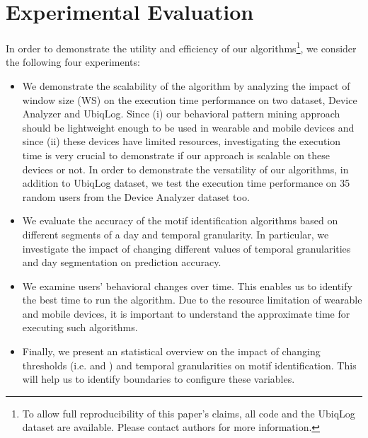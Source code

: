 \documentclass{sig-alternate}
\begin{document}
\section{Experimental Evaluation}
In order to demonstrate the utility and efficiency of our algorithms\footnote{\small{To allow full reproducibility of this paper's claims, all code and the UbiqLog dataset are available. Please contact authors for more information.}}, we consider the following four experiments:
\vspace{-0.2cm}
\begin{itemize}\itemsep1pt \parskip0pt 
\item{We demonstrate the scalability of the algorithm by analyzing the impact of window size (WS) on the execution time performance on two dataset, Device Analyzer and UbiqLog. Since (i) our behavioral pattern mining approach should be lightweight enough to be used in wearable and mobile devices and since (ii) these devices have limited resources, investigating the execution time is very crucial to demonstrate if our approach is scalable on these devices or not. In order to demonstrate the versatility of our algorithms, in addition to UbiqLog dataset, we test the execution time performance on 35 random users from the Device Analyzer dataset too.}
\item{We evaluate the accuracy of the motif identification algorithms based on different segments of a day and temporal granularity. In particular, we investigate the impact of changing different values of temporal granularities and day segmentation on prediction accuracy.}
\item{We examine users' behavioral changes over time. This enables us to identify the best time to run the algorithm. Due to the resource limitation of wearable and mobile devices, it is important to understand the approximate time for executing such algorithms.}
\item{Finally, we present an statistical overview on the impact of changing thresholds (i.e.  and ) and temporal granularities on motif identification. This will help us to identify boundaries to configure these variables.}
\end{itemize}
\vspace{-0.2cm}
\end{document}
